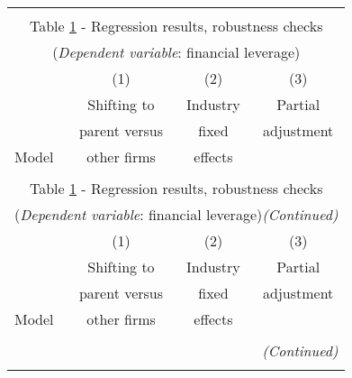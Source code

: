 \begin{longtable}{lccc}\\
	\label{reg:extension}\\
	\multicolumn{4}{c}{Table \ref{reg:extension} - Regression results, robustness checks} \\
	\multicolumn{4}{c}{(\textit{Dependent variable}: financial leverage)}\\ \hline \hline
	& (1) & (2) & (3) \\ 
 & Shifting to & Industry & Partial \\
& parent versus & fixed & adjustment \\
Model & other firms & effects &  \\ \hline
&  &  &  \\ \endfirsthead
	
	\multicolumn{4}{c}{Table \ref{reg:extension} - Regression results, robustness checks} \\
	\multicolumn{4}{c}{(\textit{Dependent variable}: financial leverage)\textit{(Continued)}}\\ \hline \hline
	& (1) & (2) & (3) \\ 
 & Shifting to & Industry & Partial \\
& parent versus & fixed & adjustment \\
Model & other firms & effects & \\ \hline
&  &  &   \\ \endhead
	
	\hline
	\multicolumn{4}{r}{{\textit{(Continued)}}}\\ \endfoot
	
	\endlastfoot

 


\end{longtable}

